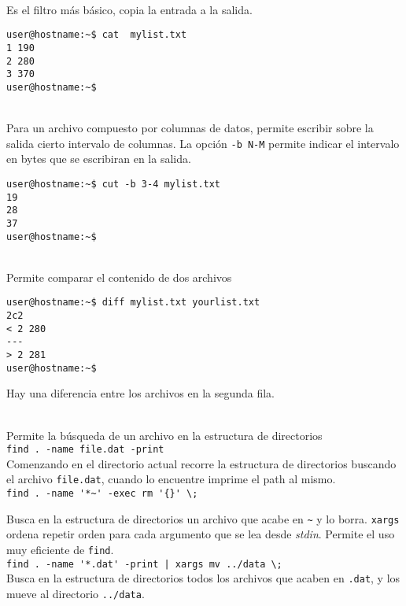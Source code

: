  \noindent
{}\\
 Es el filtro m{\'a}s b{\'a}sico, copia la entrada a la salida.
\begin{verbatim}
user@hostname:~$ cat  mylist.txt
1 190
2 280
3 370
user@hostname:~$
\end{verbatim}

\noindent
{}\\
Para un archivo compuesto por columnas de datos, permite escribir
sobre la salida cierto intervalo de columnas. La opci{\'o}n \verb=-b N-M=
permite indicar el intervalo en bytes que se escribiran en la salida.
\begin{verbatim}
user@hostname:~$ cut -b 3-4 mylist.txt
19
28
37
user@hostname:~$
\end{verbatim}

\noindent
{}\\
Permite comparar el contenido de dos archivos
\begin{verbatim}
user@hostname:~$ diff mylist.txt yourlist.txt
2c2
< 2 280
---
> 2 281
user@hostname:~$
\end{verbatim}
Hay una diferencia entre los archivos en la segunda fila. 

\noindent
{}\\
Permite la b{\'u}squeda de un archivo en la estructura de directorios\\
{\verb+find . -name file.dat -print+}\\
Comenzando en el directorio actual recorre la estructura de
directorios buscando el archivo {\verb+file.dat+}, cuando lo encuentre
imprime el path al mismo.\\
{\verb+find . -name '*~' -exec rm '{}' \;+}
 
Busca en la estructura de directorios un archivo que acabe en \verb+~+ y lo
borra. {\verb+xargs+} ordena repetir orden para cada argumento que se
lea desde {\it stdin}. Permite el uso muy eficiente de {\verb+find+}.\\
{\verb+find . -name '*.dat' -print | xargs mv ../data \;+}\\
Busca en la estructura de directorios todos los archivos que acaben en
{\verb+.dat+}, y los mueve al directorio {\verb+../data+}.

